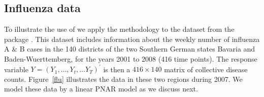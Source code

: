 \subsection{Influenza data}
\label{subsec: Applied example}


To  illustrate the use of   we apply the methodology to  the dataset  from the  package \citep{Meyer_etal_2017}. This dataset includes information about the weekly number of influenza A \& B cases in the 140 districts of the two Southern German states Bavaria and Baden-Wuerttemberg, for the years 2001 to 2008 (416 time points). The  response variable $Y=(Y_{1},\dots,Y_{t},\dots Y_{T})^\prime$ is then a $416 \times 140$ matrix of collective disease counts. Figure~\ref{flu} illustrates  the data in these two regions during 2007.  We model these data by a linear PNAR model as we discuss next.

